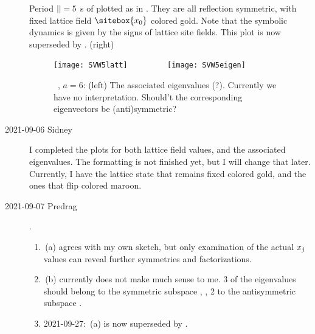 \begin{description}
 Period ${||}=5$ {\lattstate}s of 
plotted as in
. They are all reflection symmetric, with
fixed lattice field $\sitebox{\ssp_0}$ colored gold. Note that the
symbolic dynamics is given by the signs of lattice site fields.
 {\color{red} This plot is now superseded by }.
(right)\begin{figure}
  \centering
\texttt{[image: SVW5latt]}
~~~~~~~~
\texttt{[image: SVW5eigen]}
  \caption{
\Henlatt\ , $a=6$:
(left)
    {\color{red}
The associated {\jacobianOrb}
eigenvalues (?). Currently we have no interpretation. Should't
the corresponding eigenvectors be (anti)symmetric?
    }
}
\label{SVW5CycHamHen}
\end{figure}

\item[2021-09-06 Sidney]
I completed the plots for both lattice field values, and the associated
eigenvalues. The formatting is not finished yet, but I will change that
later. Currently, I have the lattice state that remains fixed colored
gold, and the ones that flip colored maroon.

\item[2021-09-07 Predrag].
\begin{enumerate}
  \item
{}\,(a) agrees with my own sketch, but only
examination of the actual $x_j$ values can reveal further symmetries and
factorizations.
  \item
{}\,(b) currently does
not make much sense to me. 3 of the eigenvalues should belong to
the symmetric subspace , ,
2 to the antisymmetric subspace  .
  \item
2021-09-27: \,(a) is now superseded by
.
\end{enumerate}



\end{description}

